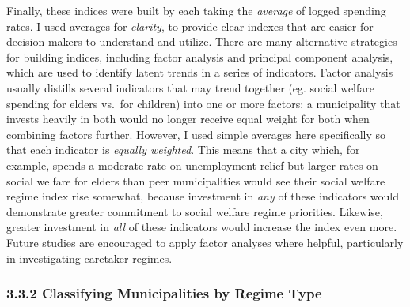 \documentclass[preprint, 3p,
authoryear]{elsarticle} %
\begin{document}
Finally, these indices were built by each taking the \emph{average} of
logged spending rates. I used averages for \emph{clarity}, to provide
clear indexes that are easier for decision-makers to understand and
utilize. There are many alternative strategies for building indices,
including factor analysis and principal component analysis, which are
used to identify latent trends in a series of indicators. Factor
analysis usually distills several indicators that may trend together
(eg. social welfare spending for elders vs.~for children) into one or
more factors; a municipality that invests heavily in both would no
longer receive equal weight for both when combining factors further.
However, I used simple averages here specifically so that each indicator
is \emph{equally weighted}. This means that a city which, for example,
spends a moderate rate on unemployment relief but larger rates on social
welfare for elders than peer municipalities would see their social
welfare regime index rise somewhat, because investment in \emph{any} of
these indicators would demonstrate greater commitment to social welfare
regime priorities. Likewise, greater investment in \emph{all} of these
indicators would increase the index even more. Future studies are
encouraged to apply factor analyses where helpful, particularly in
investigating caretaker regimes.

\hypertarget{classifying-municipalities-by-regime-type}{%
\subsubsection{3.3.2 Classifying Municipalities by Regime
Type}\label{classifying-municipalities-by-regime-type}}

\renewcommand{\baselinestretch}{0.5}\selectfont
\renewcommand{\arraystretch}{1.5}

\begingroup\fontsize{9}{11}\selectfont
\end{document}

